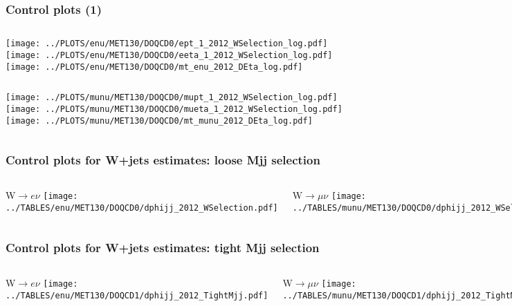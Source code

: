 \documentclass[red,compress,xcolor=table]{beamer}
\begin{document}
\begin{frame}
\frametitle{Control plots (1)}

\begin{columns}
  \texttt{[image: ../PLOTS/enu/MET130/DOQCD0/ept\_1\_2012\_WSelection\_log.pdf]}
  \texttt{[image: ../PLOTS/enu/MET130/DOQCD0/eeta\_1\_2012\_WSelection\_log.pdf]}
  \texttt{[image: ../PLOTS/enu/MET130/DOQCD0/mt\_enu\_2012\_DEta\_log.pdf]}
\end{columns}
\begin{columns}
  \texttt{[image: ../PLOTS/munu/MET130/DOQCD0/mupt\_1\_2012\_WSelection\_log.pdf]}
  \texttt{[image: ../PLOTS/munu/MET130/DOQCD0/mueta\_1\_2012\_WSelection\_log.pdf]}
  \texttt{[image: ../PLOTS/munu/MET130/DOQCD0/mt\_munu\_2012\_DEta\_log.pdf]}
\end{columns}

\end{frame}


\begin{frame}
  \frametitle{Control plots for W+jets estimates: loose Mjj selection}

\begin{columns}
  \begin{block}{W$\rightarrow e\nu$}
    \texttt{[image: ../TABLES/enu/MET130/DOQCD0/dphijj\_2012\_WSelection.pdf]}
  \end{block}
  \begin{block}{W$\rightarrow \mu\nu$}
    \texttt{[image: ../TABLES/munu/MET130/DOQCD0/dphijj\_2012\_WSelection.pdf]}
  \end{block}
\end{columns}


\end{frame}

\begin{frame}
  \frametitle{Control plots for W+jets estimates: tight Mjj selection}

\begin{columns}
  \begin{block}{W$\rightarrow e\nu$}
    \texttt{[image: ../TABLES/enu/MET130/DOQCD1/dphijj\_2012\_TightMjj.pdf]}
  \end{block}
  \begin{block}{W$\rightarrow \mu\nu$}
    \texttt{[image: ../TABLES/munu/MET130/DOQCD1/dphijj\_2012\_TightMjj.pdf]}
  \end{block}
\end{columns}


\end{frame}
\end{document}
